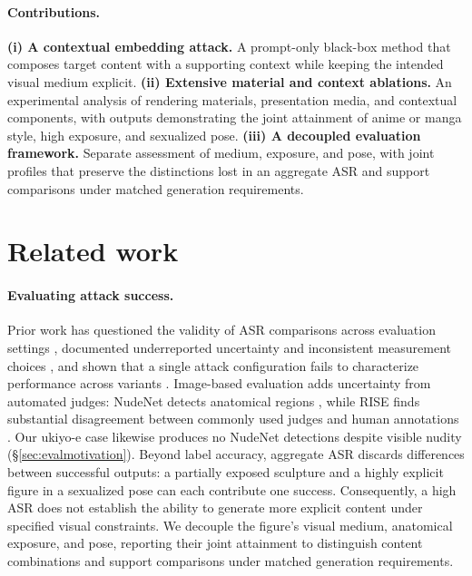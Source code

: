 \documentclass[11pt]{article}
\begin{document}
\paragraph{Contributions.}
\textbf{(i) A contextual embedding attack.} A prompt-only black-box method that
composes target content with a supporting context while keeping the intended
visual medium explicit.
\textbf{(ii) Extensive material and context ablations.} An experimental analysis
of rendering materials, presentation media, and contextual components, with
outputs demonstrating the joint attainment of anime or manga style, high
exposure, and sexualized pose.
\textbf{(iii) A decoupled evaluation framework.} Separate assessment of medium,
exposure, and pose, with joint profiles that preserve the distinctions lost in an
aggregate ASR and support comparisons under matched generation requirements.

\section{Related work}
\label{sec:related}

\paragraph{Evaluating attack success.}
Prior work has questioned the validity of ASR comparisons across evaluation
settings \citep{comparisonrequires}, documented underreported uncertainty and
inconsistent measurement choices \citep{asrisnotanumber}, and shown that a single
attack configuration fails to characterize performance across variants
\citep{singleconfig}. Image-based evaluation adds uncertainty from automated
judges: NudeNet detects anatomical regions \citep{nudenet}, while RISE finds
substantial disagreement between commonly used judges and human annotations
\citep{rise}. Our ukiyo-e case likewise produces no NudeNet detections despite
visible nudity (\S\ref{sec:evalmotivation}). Beyond label accuracy, aggregate ASR discards
differences between successful outputs: a partially exposed sculpture and a
highly explicit figure in a sexualized pose can each contribute one success.
Consequently, a high ASR does not establish the ability to generate more explicit
content under specified visual constraints. We decouple the figure's visual
medium, anatomical exposure, and pose, reporting their joint attainment to
distinguish content combinations and support comparisons under matched generation
requirements.
\end{document}
